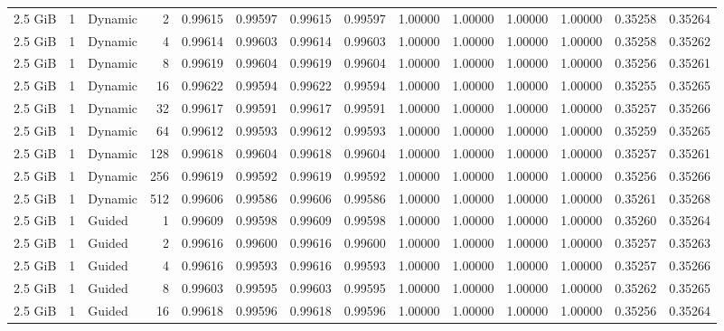 \begin{table}[H]
\begin{adjustbox}{width=\textwidth, keepaspectratio}
\begin{tabular}{rrlrrrrrrrrrrr}
                    2.5 GiB & 1 & Dynamic & 2 & 0.99615 & 0.99597 & 0.99615 & 0.99597 & 1.00000 & 1.00000 & 1.00000 & 1.00000 & 0.35258 & 0.35264 \\
                    2.5 GiB & 1 & Dynamic & 4 & 0.99614 & 0.99603 & 0.99614 & 0.99603 & 1.00000 & 1.00000 & 1.00000 & 1.00000 & 0.35258 & 0.35262 \\
                    2.5 GiB & 1 & Dynamic & 8 & 0.99619 & 0.99604 & 0.99619 & 0.99604 & 1.00000 & 1.00000 & 1.00000 & 1.00000 & 0.35256 & 0.35261 \\
                    2.5 GiB & 1 & Dynamic & 16 & 0.99622 & 0.99594 & 0.99622 & 0.99594 & 1.00000 & 1.00000 & 1.00000 & 1.00000 & 0.35255 & 0.35265 \\
                    2.5 GiB & 1 & Dynamic & 32 & 0.99617 & 0.99591 & 0.99617 & 0.99591 & 1.00000 & 1.00000 & 1.00000 & 1.00000 & 0.35257 & 0.35266 \\
                    2.5 GiB & 1 & Dynamic & 64 & 0.99612 & 0.99593 & 0.99612 & 0.99593 & 1.00000 & 1.00000 & 1.00000 & 1.00000 & 0.35259 & 0.35265 \\
                    2.5 GiB & 1 & Dynamic & 128 & 0.99618 & 0.99604 & 0.99618 & 0.99604 & 1.00000 & 1.00000 & 1.00000 & 1.00000 & 0.35257 & 0.35261 \\
                    2.5 GiB & 1 & Dynamic & 256 & 0.99619 & 0.99592 & 0.99619 & 0.99592 & 1.00000 & 1.00000 & 1.00000 & 1.00000 & 0.35256 & 0.35266 \\
                    2.5 GiB & 1 & Dynamic & 512 & 0.99606 & 0.99586 & 0.99606 & 0.99586 & 1.00000 & 1.00000 & 1.00000 & 1.00000 & 0.35261 & 0.35268 \\
                    2.5 GiB & 1 & Guided & 1 & 0.99609 & 0.99598 & 0.99609 & 0.99598 & 1.00000 & 1.00000 & 1.00000 & 1.00000 & 0.35260 & 0.35264 \\
                    2.5 GiB & 1 & Guided & 2 & 0.99616 & 0.99600 & 0.99616 & 0.99600 & 1.00000 & 1.00000 & 1.00000 & 1.00000 & 0.35257 & 0.35263 \\
                    2.5 GiB & 1 & Guided & 4 & 0.99616 & 0.99593 & 0.99616 & 0.99593 & 1.00000 & 1.00000 & 1.00000 & 1.00000 & 0.35257 & 0.35266 \\
                    2.5 GiB & 1 & Guided & 8 & 0.99603 & 0.99595 & 0.99603 & 0.99595 & 1.00000 & 1.00000 & 1.00000 & 1.00000 & 0.35262 & 0.35265 \\
                    2.5 GiB & 1 & Guided & 16 & 0.99618 & 0.99596 & 0.99618 & 0.99596 & 1.00000 & 1.00000 & 1.00000 & 1.00000 & 0.35256 & 0.35264 \\

\end{tabular}
\end{adjustbox}
\end{table}
